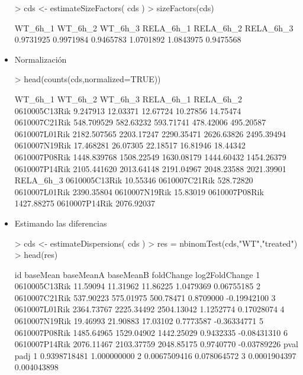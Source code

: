 \documentclass{article}
\begin{document}
\begin{itemize}
\begin{Schunk}
\begin{Sinput}
> cds <- estimateSizeFactors( cds )
> sizeFactors(cds)
\end{Sinput}
\begin{Soutput}
  WT_6h_1   WT_6h_2   WT_6h_3 RELA_6h_1 RELA_6h_2 RELA_6h_3 
0.9731925 0.9971984 0.9465783 1.0701892 1.0843975 0.9475568 
\end{Soutput}
\end{Schunk}
\item{Normalización}
\begin{Schunk}
\begin{Sinput}
> head(counts(cds,normalized=TRUE))
\end{Sinput}
\begin{Soutput}
                  WT_6h_1    WT_6h_2    WT_6h_3  RELA_6h_1  RELA_6h_2
0610005C13Rik    9.247913   12.03371   12.67724   10.27856   14.75474
0610007C21Rik  548.709529  582.63232  593.71741  478.42006  495.20587
0610007L01Rik 2182.507565 2203.17247 2290.35471 2626.63826 2495.39494
0610007N19Rik   17.468281   26.07305   22.18517   16.81946   18.44342
0610007P08Rik 1448.839768 1508.22549 1630.08179 1444.60432 1454.26379
0610007P14Rik 2105.441620 2013.64148 2191.04967 2048.23588 2021.39901
               RELA_6h_3
0610005C13Rik   10.55346
0610007C21Rik  528.72820
0610007L01Rik 2390.35804
0610007N19Rik   15.83019
0610007P08Rik 1427.88275
0610007P14Rik 2076.92037
\end{Soutput}
\end{Schunk}
\item{Estimando las diferencias}
\begin{Schunk}
\begin{Sinput}
> cds <- estimateDispersions( cds )
> res = nbinomTest(cds,"WT","treated")
> head(res)
\end{Sinput}
\begin{Soutput}
             id   baseMean  baseMeanA  baseMeanB foldChange log2FoldChange
1 0610005C13Rik   11.59094   11.31962   11.86225  1.0479369     0.06755185
2 0610007C21Rik  537.90223  575.01975  500.78471  0.8709000    -0.19942100
3 0610007L01Rik 2364.73767 2225.34492 2504.13042  1.1252774     0.17028074
4 0610007N19Rik   19.46993   21.90883   17.03102  0.7773587    -0.36334771
5 0610007P08Rik 1485.64965 1529.04902 1442.25029  0.9432335    -0.08431310
6 0610007P14Rik 2076.11467 2103.37759 2048.85175  0.9740770    -0.03789226
          pval        padj
1 0.9398718481 1.000000000
2 0.0067509416 0.078064572
3 0.0001904397 0.004043898

\end{Soutput}
\end{Schunk}
\end{itemize}
\end{document}
